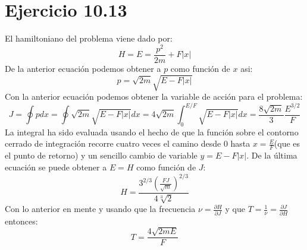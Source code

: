 \documentclass[letterpaper,10pt]{article}
\begin{document}
\section*{Ejercicio 10.13}
El hamiltoniano del problema viene dado por:
$$H=E=\frac{p^2}{2m}+F |x|$$
De la anterior ecuaci\'on podemos obtener a $p$ como funci\'on de $x$ asi:
$$p=\sqrt{2m}\sqrt{E-F|x|}$$
Con la anterior ecuaci\'on podemos obtener la variable de acci\'on para el problema:
$$J=\oint p dx=\oint \sqrt{2m}\sqrt{E-F|x|} dx=4 \sqrt{2m} \int_0^{E/F} \sqrt{E-F|x|} dx=\frac{8 \sqrt{2m}}{3} \frac{E^{3/2}}{F}$$
La integral ha sido evaluada usando el hecho de que la funci\'on sobre el contorno cerrado de integraci\'on recorre cuatro veces el camino desde $0$ hasta $x=\frac{E}{F}$(que es el punto de retorno) y un sencillo cambio de variable $y=E-F|x|$. De la \'ultima ecuaci\'on se puede obtener a $E=H$ como funci\'on de $J$:
$$H=\frac{3^{2/3} \left(\frac{F J}{\sqrt{m}}\right)^{2/3}}{4
   \sqrt[3]{2}}$$
Con lo anterior en mente y usando que la frecuencia $\nu=\frac{\partial H}{\partial J}$ y que $T=\frac{1}{\nu}=\frac{\partial J}{\partial H}$entonces:
$$T=\frac{4 \sqrt{ 2 m E}}{F}$$
\end{document}
